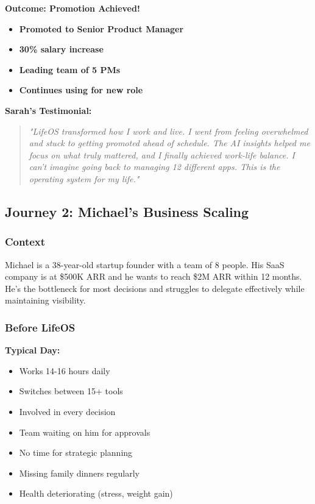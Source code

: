 \textbf{Outcome: Promotion Achieved!}

\begin{itemize}
    \item \textbf{Promoted to Senior Product Manager}
    \item \textbf{30\% salary increase}
    \item \textbf{Leading team of 5 PMs}
    \item \textbf{Continues using \lifeos{} for new role}
\end{itemize}

\textbf{Sarah's Testimonial:}
\begin{quote}
\textit{"LifeOS transformed how I work and live. I went from feeling overwhelmed and stuck to getting promoted ahead of schedule. The AI insights helped me focus on what truly mattered, and I finally achieved work-life balance. I can't imagine going back to managing 12 different apps. This is the operating system for my life."}
\end{quote}

\subsection{Journey 2: Michael's Business Scaling}

\subsubsection{Context}

Michael is a 38-year-old startup founder with a team of 8 people. His SaaS company is at \$500K ARR and he wants to reach \$2M ARR within 12 months. He's the bottleneck for most decisions and struggles to delegate effectively while maintaining visibility.

\subsubsection{Before LifeOS}

\textbf{Typical Day:}
\begin{itemize}
    \item Works 14-16 hours daily
    \item Switches between 15+ tools
    \item Involved in every decision
    \item Team waiting on him for approvals
    \item No time for strategic planning
    \item Missing family dinners regularly
    \item Health deteriorating (stress, weight gain)
\end{itemize}

